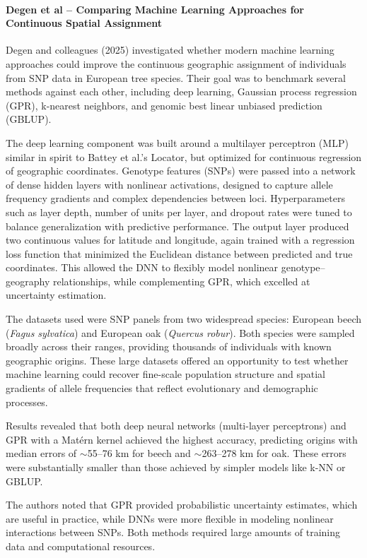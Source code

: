 \documentclass[twocolumn,10pt]{article}
\begin{document}
\paragraph{Degen et al – Comparing Machine Learning Approaches for Continuous Spatial Assignment}

Degen and colleagues (2025) \citep{degen2025machine} investigated whether modern machine learning
approaches could improve the continuous geographic assignment of individuals from SNP data in
European tree species. Their goal was to benchmark several methods against each other, including
deep learning, Gaussian process regression (GPR), k-nearest neighbors, and genomic best linear
unbiased prediction (GBLUP).

The deep learning component was built around a multilayer perceptron (MLP) similar in spirit to
Battey et al.'s Locator, but optimized for continuous regression of geographic coordinates. Genotype
features (SNPs) were passed into a network of dense hidden layers with nonlinear activations,
designed to capture allele frequency gradients and complex dependencies between loci.
Hyperparameters such as layer depth, number of units per layer, and dropout rates were tuned to
balance generalization with predictive performance. The output layer produced two continuous values
for latitude and longitude, again trained with a regression loss function that minimized the
Euclidean distance between predicted and true coordinates. This allowed the DNN to flexibly model
nonlinear genotype–geography relationships, while complementing GPR, which excelled at uncertainty
estimation.

The datasets used were SNP panels from two widespread species: European beech (\textit{Fagus
sylvatica}) and European oak (\textit{Quercus robur}). Both species were sampled broadly across
their ranges, providing thousands of individuals with known geographic origins. These large datasets
offered an opportunity to test whether machine learning could recover fine-scale population
structure and spatial gradients of allele frequencies that reflect evolutionary and demographic
processes.

Results revealed that both deep neural networks (multi-layer perceptrons) and GPR with a Matérn
kernel achieved the highest accuracy, predicting origins with median errors of $\sim$55–76 km for
beech and $\sim$263–278 km for oak. These errors were substantially smaller than those achieved by
simpler models like k-NN or GBLUP.

The authors noted that GPR provided probabilistic uncertainty estimates, which are useful in
practice, while DNNs were more flexible in modeling nonlinear interactions between SNPs. Both
methods required large amounts of training data and computational resources.
\end{document}
